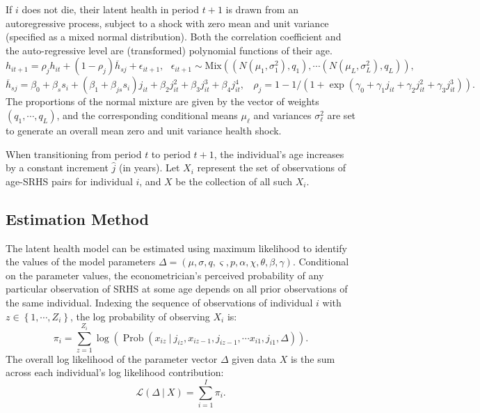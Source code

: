 \documentclass[12pt,pdftex,letterpaper]{article}
\newcommand{\Prob}{\operatorname{Prob}}
\newcommand{\Health}{h}
\newcommand{\ExpHealth}{\overline{\Health}}
\newcommand{\Report}{x}
\newcommand{\Age}{j}
\newcommand{\Sex}{s}
\newcommand{\AgeIncr}{\hat{\Age}}
\newcommand{\Corr}{\rho}
\newcommand{\Cut}{\chi}
\newcommand{\MortParam}{\theta}
\newcommand{\CorrParam}{\gamma}
\newcommand{\HealthParam}{\beta}
\newcommand{\LatentParam}{\alpha}
\newcommand{\HealthShock}{\epsilon}
\newcommand{\ShockMean}{\mu}
\newcommand{\ShockStd}{\sigma}
\newcommand{\MixProb}{q}
\newcommand{\TypeProb}{p}
\newcommand{\ReportStd}{\varsigma}
\newcommand{\Data}{X}
\newcommand{\ParamVec}{\Delta}
\newcommand{\LL}{\pi}
\begin{document}
If $i$ does not die, their latent health in period $t+1$ is drawn from an autoregressive process, subject to a shock with zero mean and unit variance (specified as a mixed normal distribution). Both the correlation coefficient and the auto-regressive level are (transformed) polynomial functions of their age.
\begin{equation}\label{HealthNext}
\Health_{it+1} = \Corr_{\Age} \Health_{it} + (1-\Corr_{\Age}) \ExpHealth_{\Sex\Age} + \HealthShock_{it+1}, ~~~ \HealthShock_{it+1} \sim \text{Mix}((N(\ShockMean_1,\ShockStd_1^2),\MixProb_1), \cdots (N(\ShockMean_L,\ShockStd_L^2),\MixProb_L)),
\end{equation}
\begin{equation*}
\ExpHealth_{\Sex\Age} = \HealthParam_0 + \HealthParam_\Sex \Sex_i + (\HealthParam_1 + \HealthParam_{\Age\Sex} \Sex_i) \Age_{it} + \HealthParam_2 \Age_{it}^2 + \HealthParam_3 \Age_{it}^3 + \HealthParam_4 \Age_{it}^4, ~~~~ \Corr_{\Age} = 1 - 1 \big/ (1 + \exp(\CorrParam_0 + \CorrParam_1 \Age_{it} + \CorrParam_2 \Age_{it}^2 + \CorrParam_3 \Age_{it}^3)).
\end{equation*}
The proportions of the normal mixture are given by the vector of weights $(\MixProb_1,\cdots,\MixProb_L)$, and the corresponding conditional means $\ShockMean_\ell$ and variances $\ShockStd_\ell^2$ are set to generate an overall mean zero and unit variance health shock.

When transitioning from period $t$ to period $t+1$, the individual's age increases by a constant increment $\AgeIncr$ (in years). Let $\Data_i$ represent the set of observations of age-SRHS pairs for individual $i$, and $\Data$ be the collection of all such $\Data_i$.


\subsection{Estimation Method}\label{sec:Estimation}

The latent health model can be estimated using maximum likelihood to identify the values of the model parameters $\ParamVec = (\ShockMean,\ShockStd,\MixProb,\ReportStd,\TypeProb,\LatentParam,\Cut,\MortParam,\HealthParam,\CorrParam)$. Conditional on the parameter values, the econometrician's perceived probability of any particular observation of SRHS at some age depends on all prior observations of the same individual. Indexing the sequence of observations of individual $i$ with $z \in \left\{1,\cdots,Z_i\right\}$, the log probability of observing $\Data_i$ is:
\begin{equation}
\LL_i = \sum_{z=1}^{Z_i} \log \left( \Prob \left(\Report_{iz} ~\big|~ \Age_{iz}, \Report_{iz-1}, \Age_{iz-1},\cdots \Report_{i1},\Age_{i1}, \Delta \right) \right) .
\end{equation}
 The overall log likelihood of the parameter vector $\ParamVec$ given data $\Data$ is the sum across each individual's log likelihood contribution:
\begin{equation}
\mathcal{L}(\ParamVec~|~\Data) = \sum_{i=1}^{I} \LL_i.
\end{equation}
\end{document}
